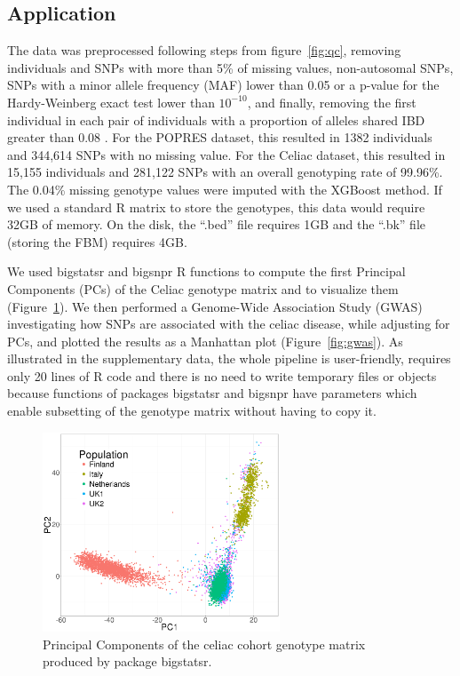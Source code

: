 \documentclass{bioinfo}
\begin{document}
\subsection{Application}
 
The data was preprocessed following steps from figure~\ref{fig:qc}, removing individuals and SNPs with more than 5\% of missing values, non-autosomal SNPs, SNPs with a minor allele frequency (MAF) lower than 0.05 or a p-value for the Hardy-Weinberg exact test lower than $10^{-10}$, and finally, removing the first individual in each pair of individuals with a proportion of alleles shared IBD greater than 0.08 \cite[]{Purcell2007}. 
For the POPRES dataset, this resulted in 1382 individuals and 344,614 SNPs with no missing value.
For the Celiac dataset, this resulted in 15,155 individuals and 281,122 SNPs with an overall genotyping rate of 99.96\%. The 0.04\% missing genotype values were imputed with the XGBoost method. If we used a standard R matrix to store the genotypes, this data would require 32GB of memory. On the disk, the ``.bed'' file requires 1GB and the ``.bk'' file (storing the FBM) requires 4GB. 

We used bigstatsr and bigsnpr R functions to compute the first Principal Components (PCs) of the Celiac genotype matrix and to visualize them (Figure~\ref{fig:pca}). We then performed a Genome-Wide Association Study (GWAS) investigating how SNPs are associated with the celiac disease, while adjusting for PCs, and plotted the results as a Manhattan plot (Figure~\ref{fig:gwas}). As illustrated in the supplementary data, the whole pipeline is user-friendly, requires only 20 lines of R code and there is no need to write temporary files or objects because functions of packages bigstatsr and bigsnpr have parameters which enable subsetting of the genotype matrix without having to copy it. 

\begin{figure}[!tpb]
\centerline{\includegraphics[width=200pt]{celiac-pca}}
\caption{Principal Components of the celiac cohort genotype matrix produced by package bigstatsr.}\label{fig:pca}
\end{figure}
\end{document}
